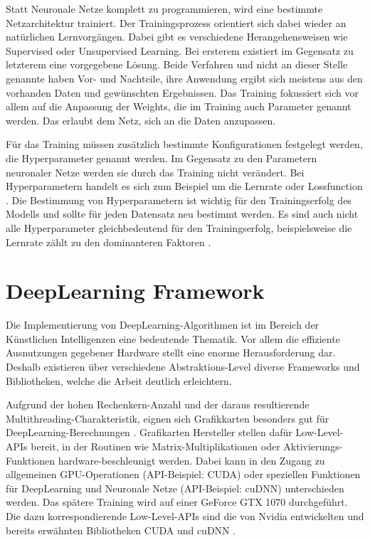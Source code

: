 Statt Neuronale Netze komplett zu programmieren, wird eine bestimmte Netzarchitektur trainiert.
Der Trainingsprozess orientiert sich dabei wieder an natürlichen Lernvorgängen.
Dabei gibt es verschiedene Herangehensweisen wie Supervised oder Unsupervised Learning.
Bei ersterem existiert im Gegensatz zu letzterem eine vorgegebene Lösung.
Beide Verfahren und nicht an dieser Stelle genannte haben Vor- und Nachteile, ihre Anwendung ergibt sich meistens aus den vorhanden Daten und gewünschten Ergebnissen.
Das Training fokussiert sich vor allem auf die Anpassung der Weights, die im Training auch Parameter genannt werden.
Das erlaubt dem Netz, sich an die Daten anzupassen.
\newline

Für das Training müssen zusätzlich bestimmte Konfigurationen festgelegt werden, die Hyperparameter genannt werden.
Im Gegensatz zu den Parametern neuronaler Netze werden sie durch das Training nicht verändert.
Bei Hyperparametern handelt es sich zum Beispiel um die Lernrate oder Lossfunction \cite{hyperparameters-gan-using-genetic-algorithm}.
Die Bestimmung von Hyperparametern ist wichtig für den Trainingserfolg des Modells und sollte für jeden Datensatz neu bestimmt werden.
Es sind auch nicht alle Hyperparameter gleichbedeutend für den Trainingserfolg, beispielsweise die Lernrate zählt zu den dominanteren Faktoren \cite{learning-rate-most-important}.

\section{DeepLearning Framework}
Die Implementierung von DeepLearning-Algorithmen ist im Bereich der Künstlichen Intelligenzen eine bedeutende Thematik.
Vor allem die effiziente Ausnutzungen gegebener Hardware stellt eine enorme Herausforderung dar. 
Deshalb existieren über verschiedene Abstraktions-Level diverse Frameworks und Bibliotheken, welche die Arbeit deutlich erleichtern.
\newline

Aufgrund der hohen Rechenkern-Anzahl und der daraus resultierende Multithreading-Charakteristik, eignen sich Grafikkarten besonders gut für DeepLearning-Berechnungen \cite{gpu-for-dl}.
Grafikarten Hersteller stellen dafür Low-Level-APIs bereit, in der Routinen wie Matrix-Multiplikationen oder Aktivierungs-Funktionen hardware-beschleunigt werden.
Dabei kann in den Zugang zu allgemeinen GPU-Operationen (API-Beispiel: CUDA) oder speziellen Funktionen für DeepLearning und Neuronale Netze (API-Beispiel: cuDNN) unterschieden werden.
Das spätere Training wird auf einer GeForce GTX 1070 \cite{gtx-1070} durchgeführt.
Die dazu korrespondierende Low-Level-APIs sind die von Nvidia entwickelten und bereits erwähnten Bibliotheken CUDA \cite{cuda-doc} und cuDNN \cite{cudnn-doc}.  
\newline

